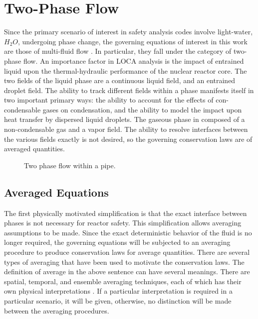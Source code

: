 \section{Two-Phase Flow}
\label{sect:two_phase_flow}
Since the primary scenario of interest in safety analysis codes involve light-water, $H_2 O$, undergoing phase change, the governing equations of interest in this work are those of multi-fluid flow \cite{Drew1998}.
In particular, they fall under the category of two-phase flow.
An importance factor in LOCA analysis is the impact of entrained liquid upon the thermal-hydraulic performance of the nuclear reactor core.
The two fields of the liquid phase are a continuous liquid field, and an entrained droplet field.
The ability to track different fields within a phase manifests itself in two important primary ways: the ability to account for the effects of con-condensable gases on condensation, and the ability to model the impact upon heat transfer by dispersed liquid droplets.
The gaseous phase in composed of a non-condensable gas and a vapor field. 
The ability to resolve interfaces between the various fields exactly is not desired, so the governing conservation laws are of averaged quantities.

\begin{figure}[ht]
\caption{Two phase flow within a pipe.}
\label{fig:pipe_with_bubbles}
\begin{center}
\end{center}
\end{figure}

\subsection{Averaged Equations}
\label{subsect:averaged_equations}
The first physically motivated simplification is that the exact interface between phases is not necessary for reactor safety.
This simplification allows averaging assumptions to be made.
Since the exact deterministic behavior of the fluid is no longer required, the governing equations will be subjected to an averaging procedure to produce conservation laws for average quantities.
There are several types of averaging that have been used to motivate the conservation laws.
The definition of average in the above sentence can have several meanings.
There are spatial, temporal, and ensemble averaging techniques, each of which has their own physical interpretations \cite{Drew1998, Todreas2011}.
If a particular interpretation is required in a particular scenario, it will be given, otherwise, no distinction will be made between the averaging procedures.

